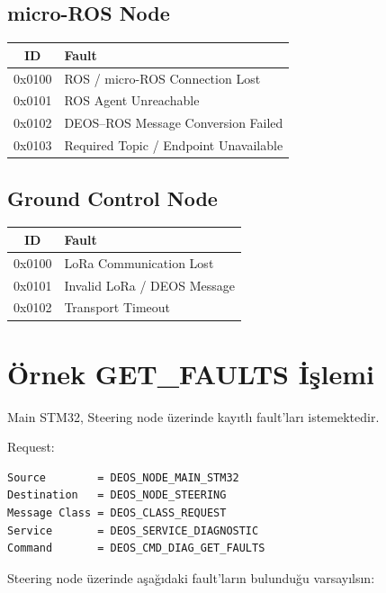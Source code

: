 \documentclass[a4paper,11pt]{article}
\begin{document}
\subsection{micro-ROS Node}

\begin{center}
\begin{tabular}{c l}
\toprule
\textbf{ID} & \textbf{Fault} \\
\midrule
0x0100 & ROS / micro-ROS Connection Lost \\
0x0101 & ROS Agent Unreachable \\
0x0102 & DEOS--ROS Message Conversion Failed \\
0x0103 & Required Topic / Endpoint Unavailable \\
\bottomrule
\end{tabular}
\end{center}

\subsection{Ground Control Node}

\begin{center}
\begin{tabular}{c l}
\toprule
\textbf{ID} & \textbf{Fault} \\
\midrule
0x0100 & LoRa Communication Lost \\
0x0101 & Invalid LoRa / DEOS Message \\
0x0102 & Transport Timeout \\
\bottomrule
\end{tabular}
\end{center}

\section{Örnek GET\_FAULTS İşlemi}

Main STM32, Steering node üzerinde kayıtlı fault'ları istemektedir.

Request:

\begin{lstlisting}
Source        = DEOS_NODE_MAIN_STM32
Destination   = DEOS_NODE_STEERING
Message Class = DEOS_CLASS_REQUEST
Service       = DEOS_SERVICE_DIAGNOSTIC
Command       = DEOS_CMD_DIAG_GET_FAULTS
\end{lstlisting}

Steering node üzerinde aşağıdaki fault'ların bulunduğu varsayılsın:
\end{document}
